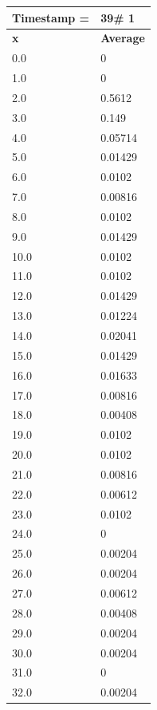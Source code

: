 \begin{tabular}{|l||l|}
\hline
\textbf{Timestamp =} & \textbf{39}\# 1\\\hline
	\textbf{x} & \textbf{Average} \\ \hline
\hline
	0.0 & 0 \\ \hline
	1.0 & 0 \\ \hline
	2.0 & 0.5612 \\ \hline
	3.0 & 0.149 \\ \hline
	4.0 & 0.05714 \\ \hline
	5.0 & 0.01429 \\ \hline
	6.0 & 0.0102 \\ \hline
	7.0 & 0.00816 \\ \hline
	8.0 & 0.0102 \\ \hline
	9.0 & 0.01429 \\ \hline
	10.0 & 0.0102 \\ \hline
	11.0 & 0.0102 \\ \hline
	12.0 & 0.01429 \\ \hline
	13.0 & 0.01224 \\ \hline
	14.0 & 0.02041 \\ \hline
	15.0 & 0.01429 \\ \hline
	16.0 & 0.01633 \\ \hline
	17.0 & 0.00816 \\ \hline
	18.0 & 0.00408 \\ \hline
	19.0 & 0.0102 \\ \hline
	20.0 & 0.0102 \\ \hline
	21.0 & 0.00816 \\ \hline
	22.0 & 0.00612 \\ \hline
	23.0 & 0.0102 \\ \hline
	24.0 & 0 \\ \hline
	25.0 & 0.00204 \\ \hline
	26.0 & 0.00204 \\ \hline
	27.0 & 0.00612 \\ \hline
	28.0 & 0.00408 \\ \hline
	29.0 & 0.00204 \\ \hline
	30.0 & 0.00204 \\ \hline
	31.0 & 0 \\ \hline
	32.0 & 0.00204 \\ \hline
\end{tabular}

